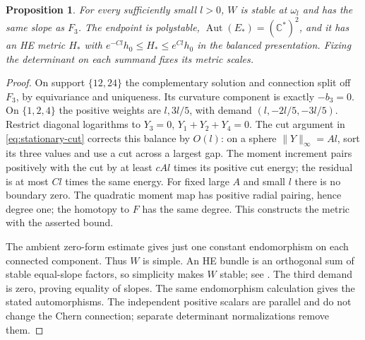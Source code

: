 \documentclass[11pt]{amsart}
\newtheorem{proposition}[theorem]{Proposition}
\theoremstyle{definition}
\theoremstyle{remark}
\newcommand{\CC}{\mathbb C}
\begin{document}
\begin{proposition}\label{prop:endpoint}
For every sufficiently small $l>0$, $W$ is stable at $\omega_l$ and
has the same slope as $F_3$. The endpoint is polystable,
$\operatorname{Aut}(E_*)=(\CC^*)^2$, and it has an HE metric
$H_*$ with $e^{-Cl}h_0\le H_*\le e^{Cl}h_0$ in the balanced
presentation. Fixing the determinant on each summand fixes its metric
scales.
\end{proposition}
\begin{proof}
On support $\{12,24\}$ the complementary solution and connection
split off $F_3$, by equivariance and uniqueness. Its curvature component
is exactly $-b_3=0$. On $\{1,2,4\}$ the positive weights are
$l,3l/5$, with demand $(l,-2l/5,-3l/5)$.
Restrict diagonal logarithms to $Y_3=0$, $Y_1+Y_2+Y_4=0$.
The cut argument in \eqref{eq:stationary-cut} corrects this balance
by $O(l)$: on a sphere $\|Y\|_\infty=Al$, sort its three values
and use a cut across a largest gap. The moment increment pairs positively
with the cut by at least $cAl$ times its positive cut energy; the residual
is at most $Cl$ times the same energy. For fixed large $A$ and small
$l$ there is no boundary zero. The quadratic moment map has positive
radial pairing, hence degree one; the homotopy to $F$ has the same degree.
This constructs the metric with the asserted bound.

The ambient zero-form estimate gives just one constant endomorphism
on each connected component. Thus $W$ is simple. An HE bundle is an
orthogonal sum of stable equal-slope factors, so simplicity makes $W$
stable; see \cite[Theorem~5.8.3]{Kobayashi87}. The third demand
is zero, proving equality of slopes. The same endomorphism calculation
gives the stated automorphisms. The independent positive scalars are
parallel and do not change the Chern connection; separate determinant
normalizations remove them.
\end{proof}
\end{document}
